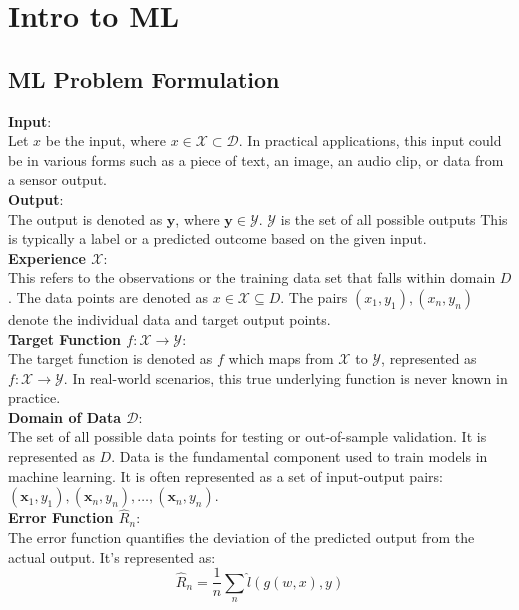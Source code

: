 \chapter{Intro to ML}


\section{ML Problem Formulation}

\textbf{Input}: \\
Let $x$ be the input, where $x\in\mathcal{X}\subset\mathcal{D}$. In practical applications, this input could be in various forms such as a piece of text, an image, an audio clip, or data from a sensor output.\\


\textbf{Output}: \\
The output is denoted as $\mathbf{y}$, where $\mathbf{y}\in\mathcal{Y}$. $\mathcal{Y}$ is the set of all possible outputs This is typically a label or a predicted outcome based on the given input.\\

\textbf{Experience \(\mathcal{X}\)}: \\
This refers to the observations or the training data set that falls within domain \(D\). The data points are denoted as \(x \in \mathcal{X} \subseteq D\). The pairs \((x_1, y_1), (x_n, y_n)\) denote the individual data and target output points.\\


\textbf{Target Function $f:\mathcal{X}\to\mathcal{Y}$}: \\
The target function is denoted as $f$ which maps from $\mathcal{X}$ to $\mathcal{Y}$, represented as $f:\mathcal{X}\to\mathcal{Y}$. In real-world scenarios, this true underlying function is never known in practice.\\

\textbf{Domain of Data $\mathcal{D}$}: \\
The set of all possible data points for testing or out-of-sample validation. It is represented as \(D\). Data is the fundamental component used to train models in machine learning. It is often represented as a set of input-output pairs: $(\mathbf{x}_1,y_1),(\mathbf{x}_n,y_n),\ldots,(\mathbf{x}_n,y_n)$. \\

\textbf{Error Function $\widehat{R}_n$}: \\
The error function quantifies the deviation of the predicted output from the actual output. It's represented as:
\[
\widehat{R}_n=\frac1n\sum_n\widehat{l}(g(w,x),y)
\]\\

